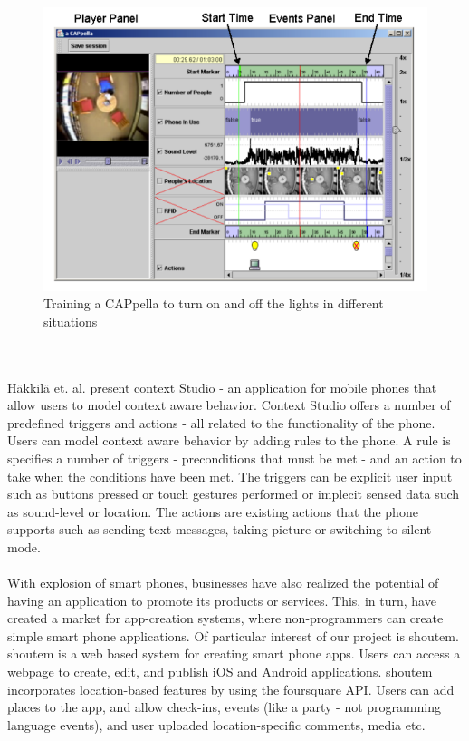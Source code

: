 \begin{figure}
	\centering
	\includegraphics[scale=0.4]{fig/acappella}
	\caption{Training a CAPpella \cite{Li:2004:TTP:1029632.1029671} to turn on and off the lights in different situations}
	\label{fig:topiary}
\end{figure}
\\\\
Häkkilä et. al. present context Studio - an application for mobile phones that allow users to model context aware behavior. Context Studio offers a number of predefined triggers and actions - all related to the functionality of the phone. Users can model context aware behavior by adding rules to the phone. A rule is specifies a number of triggers - preconditions that must be met - and an action to take when the conditions have been met. The triggers can be explicit user input such as buttons pressed or touch gestures performed or implecit sensed data such as sound-level or location. The actions are existing actions that the phone supports such as sending text messages, taking picture or switching to silent mode.
\\\\ 
With explosion of smart phones, businesses have also realized the potential of having an application to promote its products or services. This, in turn, have created a market for app-creation systems, where non-programmers can create simple smart phone applications. Of particular interest of our project is shoutem. shoutem is a web based system for creating smart phone apps. Users can access a webpage to create, edit, and publish iOS and Android applications. shoutem incorporates location-based features by using the foursquare API. Users can add places to the app, and allow check-ins, events (like a party - not programming language events), and user uploaded location-specific comments, media etc. 
